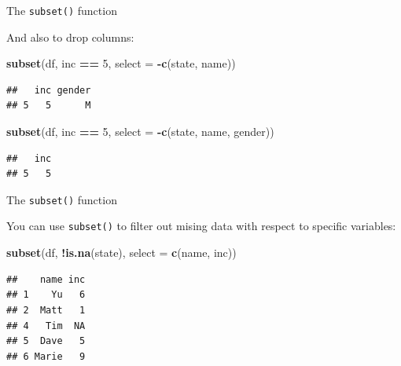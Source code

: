 \documentclass[ignorenonframetext,]{beamer}
\newenvironment{Shaded}{\begin{snugshade}}{\end{snugshade}}
\newcommand{\DataTypeTok}[1]{\textcolor[rgb]{0.13,0.29,0.53}{#1}}
\newcommand{\DecValTok}[1]{\textcolor[rgb]{0.00,0.00,0.81}{#1}}
\newcommand{\KeywordTok}[1]{\textcolor[rgb]{0.13,0.29,0.53}{\textbf{#1}}}
\newcommand{\NormalTok}[1]{#1}
\newcommand{\OperatorTok}[1]{\textcolor[rgb]{0.81,0.36,0.00}{\textbf{#1}}}
\newcommand{\StringTok}[1]{\textcolor[rgb]{0.31,0.60,0.02}{#1}}
\begin{document}
\begin{frame}[fragile]{The \texttt{subset()} function}
\protect\hypertarget{the-subset-function-5}{}

And also to drop columns:

\begin{Shaded}
\begin{Highlighting}[]
\KeywordTok{subset}\NormalTok{(df, inc }\OperatorTok{==}\StringTok{ }\DecValTok{5}\NormalTok{, }\DataTypeTok{select =} \OperatorTok{-}\KeywordTok{c}\NormalTok{(state, name))}
\end{Highlighting}
\end{Shaded}

\begin{verbatim}
##   inc gender
## 5   5      M
\end{verbatim}

\begin{Shaded}
\begin{Highlighting}[]
\KeywordTok{subset}\NormalTok{(df, inc }\OperatorTok{==}\StringTok{ }\DecValTok{5}\NormalTok{, }\DataTypeTok{select =} \OperatorTok{-}\KeywordTok{c}\NormalTok{(state, name, gender))}
\end{Highlighting}
\end{Shaded}

\begin{verbatim}
##   inc
## 5   5
\end{verbatim}

\end{frame}

\begin{frame}[fragile]{The \texttt{subset()} function}
\protect\hypertarget{the-subset-function-6}{}

You can use \texttt{subset()} to filter out mising data with respect to
specific variables:

\begin{Shaded}
\begin{Highlighting}[]
\KeywordTok{subset}\NormalTok{(df, }\OperatorTok{!}\KeywordTok{is.na}\NormalTok{(state), }\DataTypeTok{select =} \KeywordTok{c}\NormalTok{(name, inc))}
\end{Highlighting}
\end{Shaded}

\begin{verbatim}
##    name inc
## 1    Yu   6
## 2  Matt   1
## 4   Tim  NA
## 5  Dave   5
## 6 Marie   9
\end{verbatim}

\end{frame}
\end{document}
